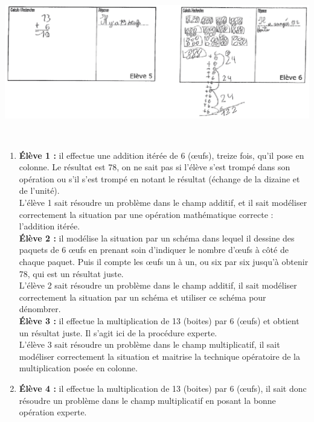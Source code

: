 \begin{exercice}[CRPE 2017 G2]
\begin{center}
   \includegraphics[width=15.2cm]{Nombres_et_calculs_did/Images/Num3_analyse_E56}
\end{center}
\vspace*{-1cm}
\end{exercice}

\begin{corrige}
\ \\ [-5mm]
\begin{enumerate}
   \item {\bf Élève 1 : } il effectue une addition itérée de 6 (\oe ufs), treize fois, qu'il pose en colonne. Le résultat est 78, on ne sait pas si l'élève s'est trompé dans son opération ou s'il s'est trompé en notant le résultat (échange de la dizaine et de l'unité). \\
   L'élève 1 sait résoudre un problème dans le champ additif, et il sait modéliser correctement la situation par une opération mathématique correcte : l'addition itérée. \\
   {\bf Élève 2 : } il modélise la situation par un schéma dans lequel il dessine des paquets de 6 \oe ufs en prenant soin d'indiquer le nombre d'\oe ufs à côté de chaque paquet. Puis il compte les \oe ufs un à un, ou six par six jusqu'à obtenir 78, qui est un résultat juste. \\
   L'élève 2 sait résoudre un problème dans le champ additif, il sait modéliser correctement la situation par un schéma et utiliser ce schéma pour dénombrer. \\
   {\bf Élève 3 : } il effectue la multiplication de 13 (boites) par 6 (\oe ufs) et obtient un résultat juste. Il s'agit ici de la procédure experte. \\
   L'élève 3 sait résoudre un problème dans le champ multiplicatif, il sait modéliser correctement la situation et maitrise la technique opératoire de la multiplication posée en colonne. \\
   \item {\bf Élève 4 : } il effectue la multiplication de 13 (boites) par 6 (\oe ufs), il sait donc résoudre un problème dans le champ multiplicatif en posant la bonne opération experte. \\

\end{enumerate}
\end{corrige}
